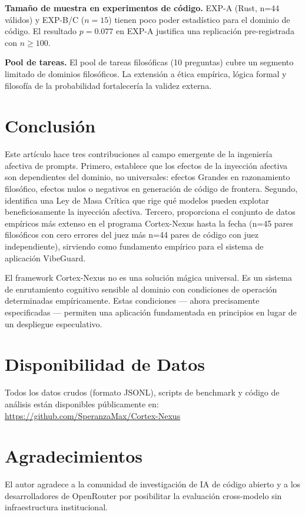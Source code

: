 \documentclass[12pt, a4paper]{article}
\begin{document}
\textbf{Tamaño de muestra en experimentos de código.} EXP-A (Rust, n=44 válidos) y EXP-B/C ($n=15$) tienen poco poder estadístico para el dominio de código. El resultado $p = 0.077$ en EXP-A justifica una replicación pre-registrada con $n \geq 100$.

\textbf{Pool de tareas.} El pool de tareas filosóficas (10 preguntas) cubre un segmento limitado de dominios filosóficos. La extensión a ética empírica, lógica formal y filosofía de la probabilidad fortalecería la validez externa.

\section{Conclusión}

Este artículo hace tres contribuciones al campo emergente de la ingeniería afectiva de prompts. Primero, establece que los efectos de la inyección afectiva son dependientes del dominio, no universales: efectos Grandes en razonamiento filosófico, efectos nulos o negativos en generación de código de frontera. Segundo, identifica una Ley de Masa Crítica que rige qué modelos pueden explotar beneficiosamente la inyección afectiva. Tercero, proporciona el conjunto de datos empíricos más extenso en el programa Cortex-Nexus hasta la fecha (n=45 pares filosóficos con cero errores del juez más n=44 pares de código con juez independiente), sirviendo como fundamento empírico para el sistema de aplicación VibeGuard.

El framework Cortex-Nexus no es una solución mágica universal. Es un sistema de enrutamiento cognitivo sensible al dominio con condiciones de operación determinadas empíricamente. Estas condiciones — ahora precisamente especificadas — permiten una aplicación fundamentada en principios en lugar de un despliegue especulativo.

\section*{Disponibilidad de Datos}
Todos los datos crudos (formato JSONL), scripts de benchmark y código de análisis están disponibles públicamente en:\\
\url{https://github.com/SperanzaMax/Cortex-Nexus}

\section*{Agradecimientos}
El autor agradece a la comunidad de investigación de IA de código abierto y a los desarrolladores de OpenRouter por posibilitar la evaluación cross-modelo sin infraestructura institucional.
\end{document}
